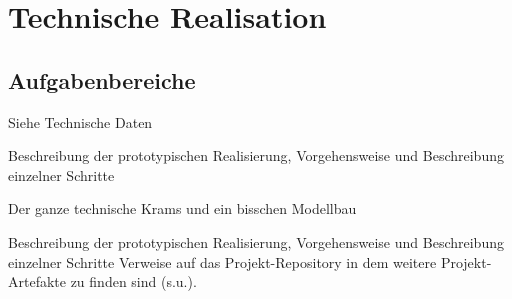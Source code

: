 \chapter{Technische Realisation}

\section{Aufgabenbereiche}
    Siehe Technische Daten

    Beschreibung der prototypischen Realisierung, Vorgehensweise und
    Beschreibung einzelner Schritte

    Der ganze technische Krams und ein bisschen Modellbau

    Beschreibung der prototypischen Realisierung, Vorgehensweise und Beschreibung einzelner Schritte
    Verweise auf das Projekt-Repository in dem weitere Projekt-Artefakte zu finden sind (s.u.).